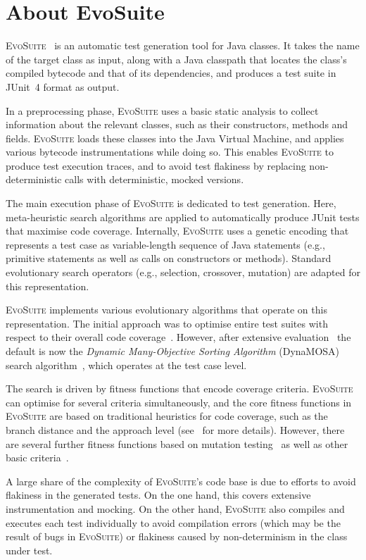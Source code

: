 \documentclass[10pt,conference]{IEEEtran}
\newcommand{\EVOSUITE}{\textsc{EvoSuite}\xspace}
\begin{document}
\section{About EvoSuite}

\EVOSUITE~\cite{FrA11c} is an automatic test generation tool for Java classes.
It takes the name of the target class as input, along with a Java classpath that
locates the class's compiled bytecode and that of its dependencies, and produces
a test suite in JUnit~4 format as output.

In a preprocessing phase, \EVOSUITE uses a basic static analysis to collect
information about the relevant classes, such as their constructors, methods
and fields. \EVOSUITE loads these classes into the Java Virtual Machine, and
applies various bytecode instrumentations while doing so. This enables \EVOSUITE
to produce test execution traces, and to avoid test flakiness by replacing
non-deterministic calls with deterministic, mocked versions.

The main execution phase of \EVOSUITE is dedicated to test generation. Here,
meta-heuristic search algorithms are applied to automatically produce JUnit
tests that maximise code coverage. Internally, \EVOSUITE uses a genetic encoding
that represents a test case as variable-length sequence of Java statements
(e.g., primitive statements as well as calls on constructors or methods).
Standard evolutionary search operators (e.g., selection, crossover, mutation)
are adapted for this representation.

\EVOSUITE implements various evolutionary algorithms that operate on this
representation. The initial approach was to optimise entire test suites with
respect to their overall code coverage~\cite{GoA_TSE12}. However, after
extensive evaluation~\cite{ea_evaluation} the default is now the
\emph{Dynamic Many-Objective Sorting Algorithm} (DynaMOSA) search
algorithm~\cite{dynamosa}, which operates at the test case level.

The search is driven by fitness functions that encode coverage criteria.
\EVOSUITE can optimise for several criteria simultaneously, and the core fitness
functions in \EVOSUITE are based on traditional heuristics for code coverage, such
as the branch distance and the approach level (see~\cite{GoA_TSE12} for more details).
However, there are several further fitness functions based on mutation
testing~\cite{emse14_mutation} as well as other basic
criteria~\cite{rojas2015combining}.

A large share of the complexity of \EVOSUITE's code base is due to efforts to
avoid flakiness in the generated tests. On the one hand, this covers extensive
instrumentation and mocking. On the other hand, \EVOSUITE also compiles and
executes each test individually to avoid compilation errors (which may be the
result of bugs in \EVOSUITE) or flakiness caused by non-determinism in the
class under test.
\end{document}
